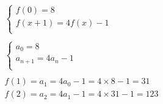 \documentclass{article}
\begin{document}
\begin{equation*}
  \begin{aligned}
  & \begin{cases}
    f(0) = 8 \\
    f(x + 1) = 4f(x) - 1 \\
  \end{cases} \\
  \\
  & \begin{cases}
    a_0 = 8 \\
    a_{n + 1} = 4a_n - 1 \\
  \end{cases} \\
  \\
  & f(1) = a_1 = 4a_0 - 1 = 4 \times 8 - 1 = 31 \\
  & f(2) = a_2 = 4a_1 - 1 = 4 \times 31 - 1 = 123 \\
\end{aligned}
\end{equation*}
\end{document}
